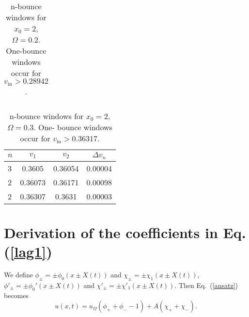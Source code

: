 \documentclass[vecphys]{svmult}		%
\begin{document}
{\begin{table}
\begin{center}
{\begin{tabular}{|l|c|c|c|}
		
	
		
		\hline
	\end{tabular}

\caption{n-bounce windows for $x_0=2$, $\Omega=0.2$. One-bounce windows occur for $v_\mathrm{in}>0.28942$.}
}
\end{center}
\end{table}


\begin{table}\label{mb-x0_2_2}
\begin{center}
{
 \begin{tabular}{|l|c|c|c|}
		\hline
		$n$ & $v_1$ & $v_2$ & $\Delta v_n$ \\
		\hline
		3 & 0.3605 &  0.36054 & 0.00004  \\
		2 & 0.36073 & 0.36171 & 0.00098 \\
		2 & 0.36307& 0.3631 & 0.00003\\
						
		\hline
	\end{tabular}

\caption{n-bounce windows for $x_0=2$, $\Omega=0.3$. One- bounce windows occur for $v_\mathrm{in}>0.36317$.}
}
\end{center}
\end{table}

\newpage
\section{Derivation of the coefficients in Eq. (\ref{lag1})}
We define $\phi_{\pm}=\pm \phi_0(x\pm X(t))$ and $\chi_{\pm}=\pm \chi_{1}(x\pm X(t))$, $\phi'_{\pm}=\pm \phi_0'(x\pm X(t))$ and $\chi'_{\pm}=\pm \chi'_1(x\pm X(t))$. Then Eq.~(\ref{ansatz}) becomes
\begin{equation} \label{kink-antikink_2}
u(x,t)=u_{\Omega}(\phi _+ + \phi_{-} -1) + A(\chi_{+}+\chi_{-}).
\end{equation}



}
\end{document}

